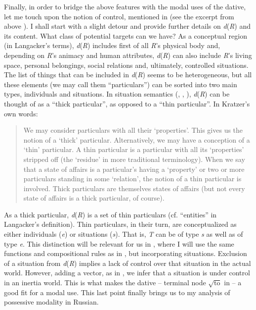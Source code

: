 \documentclass[output=paper,colorlinks,citecolor=brown,modfonts,nonflat]{langsci/langscibook}
\begin{document}
Finally, in order to bridge the above features with the modal uses of the dative, let me touch upon the notion of control, mentioned in  (see the excerpt from \citeauthor{BjorkmanCowper2016} above ). I shall start with a slight detour and provide further details on \textit{d}(\textit{R}) and its content. What class of potential targets can we have? As a conceptual region (in Langacker’s terms), \textit{d}(\textit{R}) includes first of all \textit{R}’s physical body and, depending on \textit{R}’s animacy and human attributes, \textit{d}(\textit{R}) can also include \textit{R}’s living space, personal belongings, social relations and, ultimately, controlled situations. The list of things that can be included in \textit{d}(\textit{R}) seems to be heterogeneous, but all these elements (we may call them “particulars”) can be sorted into two main types, individuals and situations. In situation semantics (\citealt{Kratzer1989}, \citeyear{Kratzer2002}, \citeyear{Kratzer2019}), \textit{d}(\textit{R}) can be thought of as a “thick particular”, as opposed to a “thin particular”. In Kratzer’s own words:

\begin{quote}
We may consider particulars with all their ‘properties’. This gives us the notion of a ‘thick’ particular. Alternatively, we may have a conception of a ‘thin’ particular. A thin particular is a particular with all its ‘properties’ stripped off (the ‘residue’ in more traditional terminology). When we say that a state of affairs is a particular’s having a ‘property’ or two or more particulars standing in some ‘relation’, the notion of a thin particular is involved. Thick particulars are themselves states of affairs (but not every state of affairs is a thick particular, of course). \hfill \citep[613]{Kratzer1989}
\end{quote}

As a thick particular, \textit{d}(\textit{R}) is a set of thin particulars (cf. “entities” in Langacker’s definition). Thin particulars, in their turn, are conceptualized as either individuals (\textit{e}) or situations (\textit{s}). That is, \textit{T} can be of type \textit{s} as well as of type \textit{e}. This distinction will be relevant for us in , where I will use the same functions and compositional rules as in , but incorporating situations. Exclusion of a situation from \textit{d}(\textit{R}) implies a lack of control over that situation in the actual world. However, adding a vector, as in , we infer that a situation is under control in an inertia world. This is what makes the dative – terminal node  $\sqrt{\text{to}}$  in  – a good fit for a modal use. This last point finally brings us to my analysis of possessive modality in Russian.
\end{document}

